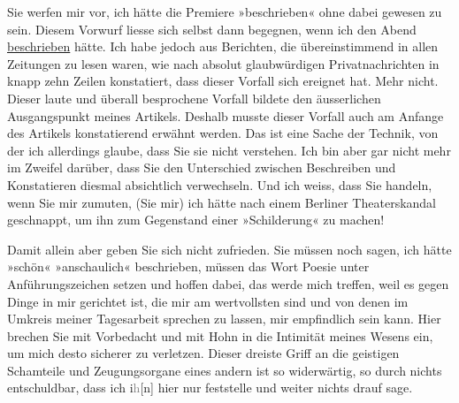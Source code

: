 \pstart
           Sie werfen mir vor, ich hätte die Premiere »beschrieben« ohne dabei gewesen zu sein. Diesem Vorwurf liesse
               sich selbst dann begegnen, wenn ich den Abend \uline{beschrieben} hätte. Ich habe jedoch aus Berichten, die übereinstimmend in
               allen Zeitungen zu lesen waren, wie nach absolut glaubwürdigen Privatnachrichten in
               knapp zehn Zeilen konstatiert, dass dieser Vorfall sich ereignet hat. Mehr nicht.
               Dieser laute und überall besprochene Vorfall bildete den äusserlichen Ausgangspunkt
               meines Artikels. Deshalb
               musste dieser Vorfall auch am Anfange des Artikels konstatierend erwähnt werden. Das ist eine Sache
               der Technik, von der ich allerdings glaube, dass Sie sie nicht verstehen. Ich bin
               aber gar nicht mehr im Zweifel darüber, dass Sie den Unterschied zwischen Beschreiben
               und Konstatieren diesmal absichtlich verwechseln. Und ich weiss, dass Sie \label{K_L03438-12v}\label{K_L03438-12}
               handeln, wenn Sie mir zumuten, (Sie mir) ich hätte nach einem Berliner Theaterskandal geschnappt, um ihn zum Gegenstand einer
               »Schilderung« zu machen!\pend
           
\pstart
           Damit allein aber geben Sie sich nicht zufrieden. Sie müssen noch sagen, ich hätte
               »schön« »anschaulich« beschrieben, müssen das Wort Poesie unter Anführungszeichen
               setzen und hoffen dabei, das werde mich treffen, weil es gegen Dinge in mir gerichtet
               ist, die mir am wertvollsten sind und von denen im Umkreis meiner Tagesarbeit
               sprechen zu lassen, mir empfindlich sein kann. {\pb}Hier brechen Sie mit Vorbedacht
               und mit Hohn in die Intimität meines Wesens ein, um mich desto sicherer zu verletzen.
               Dieser dreiste Griff an die geistigen Schamteile und Zeugungsorgane eines andern ist
               so widerwärtig, so durch nichts entschuldbar, dass ich i\textcolor{gray}{h}{[}n{]} hier nur feststelle und weiter nichts drauf sage.\pend
           
